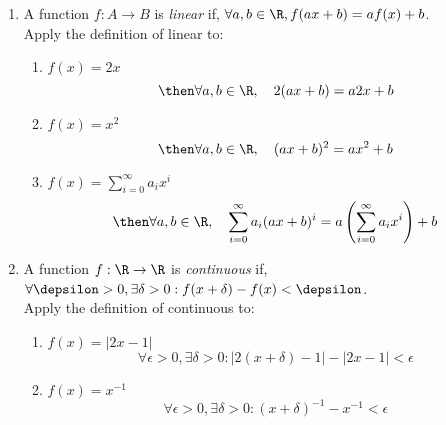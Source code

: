 \documentclass[basic, header]{nosvagor-notes}
\begin{document}
\begin{enumerate}[itemsep=5em]

  \item A function \(f : A \to B \) is \textit{linear} if, \(\forall a,b \in
    \R, f(ax + b) = a f(x) + b\). \\
    Apply the definition of linear to:
    \begin{enumerate}[itemsep=3em]

      \item \(f(x) = 2x\)
        \[%
          \then \forall a,b \in \R, \quad 2(ax + b) =  a 2x + b
        \]%

      \item \(f(x) = x^2\)
        \[%
          \then \forall a,b \in \R, \quad (ax + b)^2 = ax^2 + b
        \]%

      \item \(\displaystyle f(x) = \sum_{i=0}^{\infty} a_i x^i \)
        \[%
          \then \forall a,b \in \R, \quad \sum_{i=0}^{\infty} a_i (ax + b)^i =  a \left(\sum_{i=0}^{\infty} a_i x^i\right) + b
        \]%

    \end{enumerate}

  \item A function \(f : \R \to \R \) is \textit{continuous} if, \(\forall
    \depsilon > 0, \exists \delta > 0 : f(x+\delta) - f(x) < \depsilon\).\\
    Apply the definition of continuous to:
    \begin{enumerate}[itemsep=3em]

      \item \(f(x) = |2x - 1|\)
        \[%
          \forall \epsilon > 0, \exists \delta > 0 :
          |2(x+\delta) - 1 | - |2x -1 | < \epsilon
        \]%

      \item \(f(x) = x^{-1}\)
        \[%
          \forall \epsilon > 0, \exists \delta > 0 :
          (x + \delta)^{-1} - x^{-1} < \epsilon
        \]%


\end{enumerate}
\end{enumerate}
\end{document}
